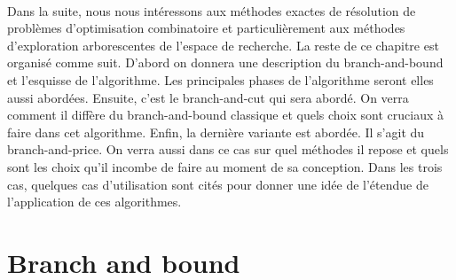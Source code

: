 \documentclass[12pt,a4paper,oneside]{book}
\theoremstyle{definition}
\begin{document}
	\paragraph{}
	Dans la suite, nous nous intéressons aux méthodes exactes de résolution de problèmes d'optimisation combinatoire et particulièrement aux méthodes d'exploration arborescentes de l'espace de recherche. 
	La reste de ce chapitre est organisé comme suit. D'abord on donnera une description du branch-and-bound et l'esquisse de l'algorithme. Les principales phases de l'algorithme seront elles aussi abordées. Ensuite, c'est le branch-and-cut qui sera abordé. On verra comment il diffère du branch-and-bound classique et quels choix sont cruciaux à faire dans cet algorithme. Enfin, la dernière variante est abordée. Il s'agit du branch-and-price. On verra aussi dans ce cas sur quel méthodes il repose et quels sont les choix qu'il incombe de faire au moment de sa conception. Dans les trois cas, quelques cas d'utilisation sont cités pour donner une idée de l'étendue de l'application de ces algorithmes.
	 
	\section{Branch and bound} \label{bb}
\end{document}
